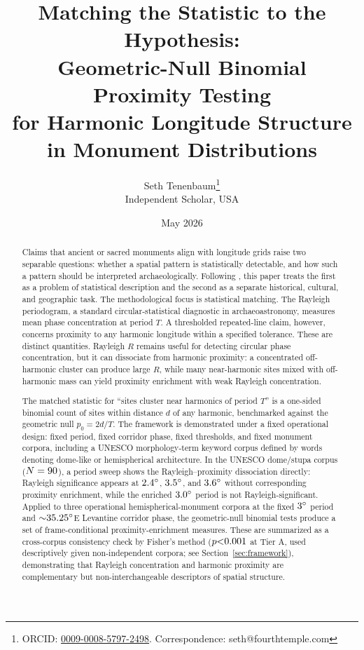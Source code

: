 \documentclass[12pt,a4paper]{article}
\newcommand{\degr}{\ifmmode^\circ\else\textdegree{}\fi}
\begin{document}
\title{Matching the Statistic to the Hypothesis:\\
Geometric-Null Binomial Proximity Testing\\
for Harmonic Longitude Structure in Monument Distributions}

\author{Seth Tenenbaum\thanks{ORCID:
\href{https://orcid.org/0009-0008-5797-2498}{0009-0008-5797-2498}.
Correspondence: seth@fourthtemple.com}\\
Independent Scholar, USA}

\date{May 2026}

\maketitle

\begin{abstract}
Claims that ancient or sacred monuments align with longitude grids
raise two separable questions: whether a spatial pattern is
statistically detectable, and how such a pattern should be interpreted
archaeologically. Following \citet{silva2020statistical}, this paper
treats the first as a problem of statistical description and the second
as a separate historical, cultural, and geographic task. The
methodological focus is statistical matching. The Rayleigh periodogram,
a standard circular-statistical diagnostic in archaeoastronomy,
measures mean phase concentration at period $T$. A thresholded
repeated-line claim, however, concerns proximity to any harmonic
longitude within a specified tolerance. These are distinct quantities.
Rayleigh $R$ remains useful for detecting circular phase concentration,
but it can dissociate from harmonic proximity: a concentrated
off-harmonic cluster can produce large $R$, while many near-harmonic
sites mixed with off-harmonic mass can yield proximity enrichment with
weak Rayleigh concentration.

The matched statistic for ``sites cluster near harmonics of period
$T$'' is a one-sided binomial count of sites within distance $d$ of
any harmonic, benchmarked against the geometric null $p_0 = 2d/T$.
The framework is demonstrated under a fixed operational design: fixed
period, fixed corridor phase, fixed thresholds, and fixed monument corpora,
including a UNESCO morphology-term keyword corpus defined by words
denoting dome-like or hemispherical architecture. In the UNESCO
dome/stupa corpus ($N = 90{}$), a period sweep shows
the Rayleigh--proximity dissociation directly: Rayleigh significance
appears at $2.4\degr$, $3.5\degr$, and $3.6\degr$ without
corresponding proximity enrichment, while the enriched $3.0\degr$
period is not Rayleigh-significant. Applied to three operational
hemispherical-monument corpora at the fixed $3\degr$ period and
${\sim}35.25\degr$E Levantine corridor phase, the geometric-null binomial tests
produce a set of frame-conditional proximity-enrichment measures.
These are summarized as a cross-corpus consistency check by Fisher's
method ($p {<}0.001{}$ at Tier A, used descriptively given
non-independent corpora; see Section~\ref{sec:framework}), demonstrating that
Rayleigh concentration and harmonic proximity are complementary but
non-interchangeable descriptors of spatial structure.
\end{abstract}
\end{document}
